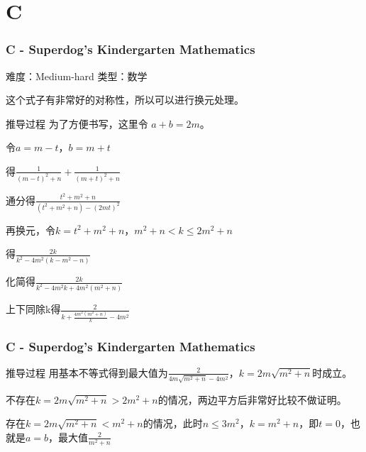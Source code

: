 \section{C}
\begin{frame}
\frametitle{C - Superdog's Kindergarten Mathematics}
难度：Medium-hard
类型：数学

这个式子有非常好的对称性，所以可以进行换元处理。
\begin{block}{推导过程}
为了方便书写，这里令 $a+b=2m$。

令$a=m-t，b=m+t$

得$\frac{1}{(m-t)^2+n}+\frac{1}{(m+t)^2+n}$

通分得$\frac{t^2+m^2+n}{(t^2+m^2+n)-(2mt)^2}$

再换元，令$k=t^2+m^2+n$，$ m^2+n <k \leq 2m^2+n$

得$\frac{2k}{k^2-4m^2(k-m^2-n)}$

化简得$\frac{2k}{k^2-4m^2k+4m^2(m^2+n)}$

上下同除k得$\frac{2}{k+\frac{4m^2(m^2+n)}{k}-4m^2}$
\end{block}
\end{frame}

\begin{frame}

\frametitle{C - Superdog's Kindergarten Mathematics}
\begin{block}{推导过程}
用基本不等式得到最大值为$\frac{2}{4m\sqrt{m^2+n}-4m^2}$，$k=2m\sqrt{m^2+n}$时成立。

不存在$k=2m\sqrt{m^2+n}>2m^2+n$的情况，两边平方后非常好比较不做证明。

存在$k=2m\sqrt{m^2+n}<m^2+n$的情况，此时$n \leq 3m^2$，$k=m^2+n$，即$t=0$，也就是$a=b$，最大值$\frac{2}{m^2+n}$
\end{block}
\end{frame}